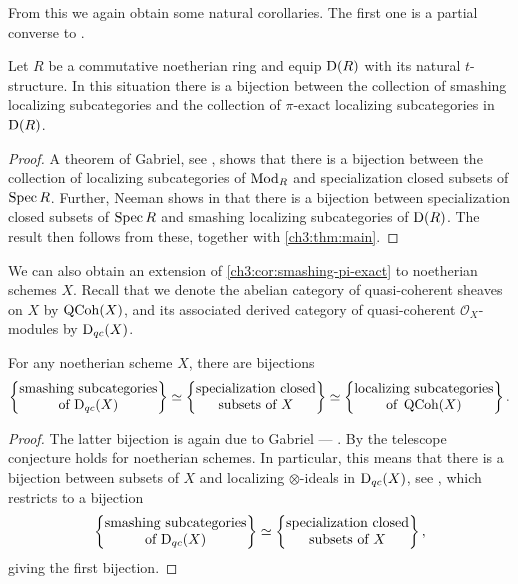 
From this we again obtain some natural corollaries. The first one is a partial converse to \cite[2.13]{takahashi_2009}.

\begin{corollary}
    \label{ch3:cor:smashing-pi-exact}
    Let $R$ be a commutative noetherian ring and equip $\mathrm{D}(R)$ with its natural $t$-structure. In this situation there is a bijection between the collection of smashing localizing subcategories and the collection of $\pi$-exact localizing subcategories in $\mathrm{D}(R)$. 
\end{corollary}
\begin{proof}
    A theorem of Gabriel, see \cite[VI.2.4(b)]{gabriel_1962}, shows that there is a bijection between the collection of localizing subcategories of $\mathrm{Mod}_R$ and specialization closed subsets of $\operatorname{Spec} R$. Further, Neeman shows in \cite[3.3]{neeman_1992} that there is a bijection between specialization closed subsets of $\operatorname{Spec} R$ and smashing localizing subcategories of $\mathrm{D}(R)$. The result then follows from these, together with \cref{ch3:thm:main}. 
\end{proof}

We can also obtain an extension of \cref{ch3:cor:smashing-pi-exact} to noetherian schemes $X$. Recall that we denote the abelian category of quasi-coherent sheaves on $X$ by $\operatorname{QCoh}(X)$, and its associated derived category of quasi-coherent $\mathcal{O}_X$-modules by $\mathrm{D}_{qc}(X)$. 

\begin{lemma}
    For any noetherian scheme $X$, there are bijections
    \[\left\{ \begin{matrix} \text{smashing subcategories}\\ \text{of }\mathrm{D}_{qc}(X) \end{matrix} \right\}\simeq \left\{ \begin{matrix} \text{specialization closed}\\ \text{subsets of }X \end{matrix} \right\} \simeq \left\{ \begin{matrix} \text{localizing subcategories}\\ \text{of }\operatorname{QCoh}(X) \end{matrix} \right\}.\]
\end{lemma}
\begin{proof}
    The latter bijection is again due to Gabriel --- \cite[VI.2.4(b)]{gabriel_1962}. By \cite[4.13]{tarrio-lopez-salorio_2004} the telescope conjecture holds for noetherian schemes. In particular, this means that there is a bijection between subsets of $X$ and localizing $\otimes$-ideals in $\mathrm{D}_{qc}(X)$, see \cite[8.13]{stevenson_2013}, which restricts to a bijection
    \[\left\{ \begin{matrix} \text{smashing subcategories}\\ \text{of }\mathrm{D}_{qc}(X) \end{matrix} \right\}\simeq \left\{ \begin{matrix} \text{specialization closed}\\ \text{subsets of }X \end{matrix} \right\},\]
    giving the first bijection. 
\end{proof}

